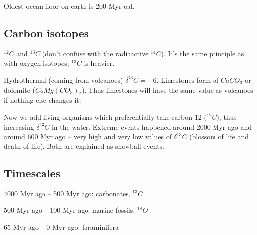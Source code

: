 Oldest ocean floor on earth is 200 Myr old.

\subsection{Carbon isotopes}
$^{12}C$ and $^{13}C$ (don't confuse with the radioactive $^{14}C$). It's the
same principle as with oxygen isotopes, $^{13}C$ is heavier.

Hydrothermal (coming from volcanoes) $\delta^{13}C = -6$. Limestones form of
$CaCO_3$ or dolomite ($CaMg(CO_3)_2$). Thus limestones will have the same value
as volcanoes if nothing else changes it.

Now we add living organisms which preferentially take carbon 12 ($^{12}C$),
thus increasing $\delta^{13}C$ in the water. Extreme events happened around
2000 Myr ago and around 600 Myr ago -- very high and very low values of
$\delta^{13}C$ (blossom of life and death of life). Both are explained as
snowball events.

\subsection{Timescales}

4000 Myr ago -- 500 Myr ago: carbonates, $^{13}C$

500 Myr ago -- 100 Myr ago: marine fossils, $^{18}O$

65 Myr ago -- 0 Myr ago: foraminifera
